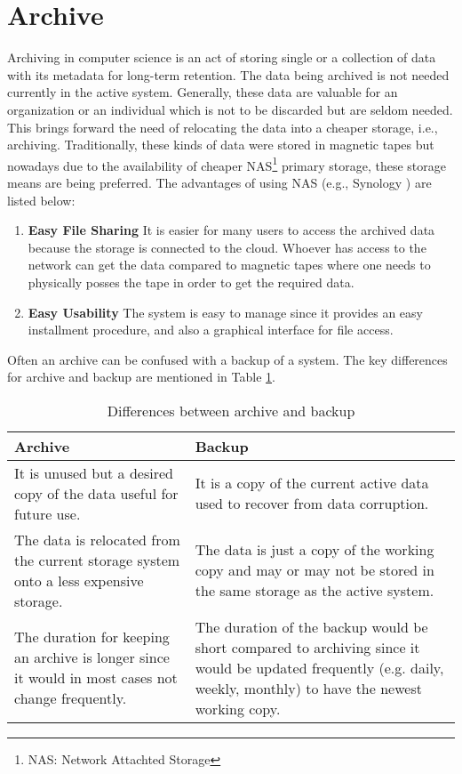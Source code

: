 \section{Archive}
Archiving in computer science is an act of storing single or a collection of data with its metadata for long-term retention. The data being archived is 
not needed currently in the active system. Generally, these data are valuable for an organization or an individual which is not to be discarded but are seldom needed. 
This brings forward the need of relocating the data into a cheaper storage, i.e., archiving. Traditionally, these kinds of data were stored in magnetic tapes but nowadays 
due to the availability of cheaper NAS\footnote{NAS: Network Attachted Storage} primary storage, 
these storage means are being preferred. 
The advantages of using NAS (e.g., Synology \cite{Synology}) are listed below:
\begin{enumerate}
    \item \textbf{Easy File Sharing} It is easier for many users to access the archived data because the storage is connected to the cloud. Whoever has access to the
    network can get the data compared to magnetic tapes where one needs to physically posses the tape in order to get the required data.
    \item \textbf{Easy Usability} The system is easy to manage since it provides an easy installment procedure, and also a graphical interface for file access.
\end{enumerate}
Often an archive can be confused
with a backup of a system. The key differences for archive and backup are mentioned in Table \ref{table:archiveVsBackup}.

\begin{table}[H]
    \centering
    \begin{tabular}{|p{7cm}|p{7cm}|}
        \hline
            \textbf{Archive}  & \textbf{Backup}\\
        \hline
            It is unused but a desired copy of the data useful for future use.& 
            It is a copy of the current active data used to recover from data corruption. \\
        \hline
            The data is relocated from the current storage system onto a less expensive storage.
            & The data is just a copy of the working copy and may or may not be stored in the same storage as the active system.\\
        \hline
             The duration for keeping an archive is longer since it would in most cases not change frequently.
             & The duration of the backup would be short compared to archiving since it would be updated frequently (e.g. daily, weekly, monthly) to have the newest 
             working copy.\\
        \hline
    \end{tabular}
    \caption{Differences between archive and backup}
    \label{table:archiveVsBackup}     
\end{table}    